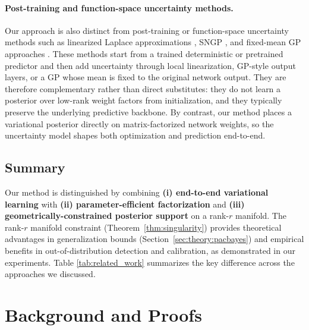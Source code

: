 \documentclass{article}
\theoremstyle{plain}
\theoremstyle{definition}
\theoremstyle{remark}
\begin{document}
\paragraph{Post-training and function-space uncertainty methods.}
Our approach is also distinct from post-training or function-space uncertainty
methods such as linearized Laplace approximations \citep{immer2021improving},
SNGP \citep{liu2020simple}, and fixed-mean GP approaches
\citep{ortega2024fixed}. These methods start from a trained deterministic or
pretrained predictor and then add uncertainty through local linearization,
GP-style output layers, or a GP whose mean is fixed to the original network
output. They are therefore complementary rather than direct substitutes: they do
not learn a posterior over low-rank weight factors from initialization, and they
typically preserve the underlying predictive backbone. By contrast, our method
places a variational posterior directly on matrix-factorized network weights, so
the uncertainty model shapes both optimization and prediction end-to-end.

\subsection{Summary}

Our method is distinguished by combining \textbf{(i) end-to-end variational learning} with \textbf{(ii) parameter-efficient factorization} and \textbf{(iii) geometrically-constrained posterior support} on a rank-$r$ manifold. The rank-$r$ manifold constraint (Theorem~\ref{thm:singularity}) provides theoretical advantages in generalization bounds (Section~\ref{sec:theory:pacbayes}) and empirical benefits in out-of-distribution detection and calibration, as demonstrated in our experiments. Table \ref{tab:related_work} summarizes the key difference across the approaches we discussed. 

\section{Background and Proofs}\label{app:background_proofs}
\end{document}
